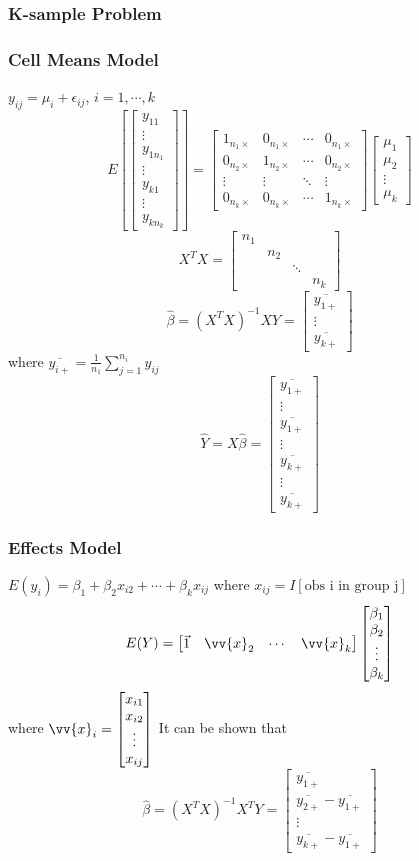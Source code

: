 \documentclass[11pt]{article}
\newcommand{\cv}[1]{\begin{bmatrix} #1 \end{bmatrix}}
\newcommand{\vx}{\vv{x}}
\begin{document}
\subsubsection{K-sample Problem}
\subsubsection*{Cell Means Model}
$y_{ij} = \mu_i + \epsilon_{ij}$, $i=1,\cdots,k$
\[E\left[\cv{y_{11}\\\vdots\\y_{1n_1}\\\vdots\\y_{k1}\\\vdots\\y_{kn_k}}\right] = \cv{1_{n_1\times}&0_{n_1\times}&\cdots&0_{n_1\times}\\0_{n_2\times}&1_{n_2\times}&\cdots&0_{n_2\times}\\\vdots&\vdots&\ddots&\vdots\\0_{n_k\times}&0_{n_k\times}&\cdots&1_{n_k\times}}\cv{\mu_1\\\mu_2\\\vdots\\\mu_k}\]
\[X^TX = \cv{n_1 &&& \\ &n_2&& \\&&\ddots& \\&&&n_k}\]
\[\hat\beta = (X^TX)^{-1}XY = \cv{\overline{y_{1+}}\\\vdots\\\overline{y_{k+}}}\]
where $\overline{y_{i+}} = \frac{1}{n_1}\sum_{j=1}^{n_i}y_{ij}$
\[\hat Y = X\hat\beta = \cv{\overline{y_{1+}}\\\vdots\\\overline{y_{1+}} \\\vdots\\\overline{y_{k+}}\\\vdots\\\overline{y_{k+}}}\]
\subsubsection*{Effects Model}
$E(y_i) = \beta_1 + \beta_2x_{i2} + \cdots+\beta_kx_{ij}$ where $x_{ij} = I[\text{obs i in group j}]$
\[E(Y) = \cv{\vec{1}& \vx_2&\cdots &\vx_k}\cv{\beta_1\\\beta_2\\\vdots\\\beta_k}\] where $\vx_i = \cv{x_{i1}\\x_{i2}\\\vdots\\ x_{ij}}$
It can be shown that 
\[\hat\beta = (X^TX)^{-1}X^TY = \cv{\overline{y_{1+}} \\\overline{y_{2+}} - \overline{y_{1+}} \\\vdots \\\overline{y_{k+}} - \overline{y_{1+}}}\]
\end{document}
